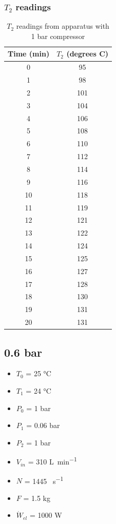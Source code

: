 \documentclass[class=article, crop=false, 12pt,a4paper]{standalone}
\numberwithin{equation}{section}
\begin{document}
\subsubsection{\(T_2\) readings} 
\begin{table}
  \centering
    \begin{tabular}{|c|c|}
      \hline
      Time (\si{\minute}) & \(T_2\) (degrees C)\\
      \hline
      0 & 95\\
      1 & 98\\
      2 & 101\\
      3 & 104\\
      4 & 106\\
      5 & 108\\
      6 & 110\\
      7 & 112\\
      8 & 114\\
      9 & 116\\
      10 & 118\\
      11 & 119\\
      12 & 121\\
      13 & 122\\
      14 & 124\\
      15 & 125\\
      16 & 127\\
      17 & 128\\
      18 & 130\\
      19 & 131\\
      20 & 131\\
      \hline
    \end{tabular}
  \caption{\(T_2\) readings from apparatus with 1 bar compressor}
  \label{table:1}
\end{table}
\subsection{0.6 bar}
\begin{multicols}{2}
  \begin{itemize}[noitemsep]
    \item \(T_0\) = 25 \si{\celsius}
    \item \(T_1\) = 24 \si{\celsius}
    \item \(P_0\) = 1 \si{\bar}
    \item \(P_1\) = 0.06 \si{\bar}
    \item \(P_2\) = 1 \si{\bar}
    \item \(V_{in}\) = 310 \si{\liter\per\minute}
    \item \(N\) = 1445 \si{\rev\per\second}
    \item \(F\) = 1.5 \si{\kilogram}
    \item \(\dot{W}_{el}\) = 1000 \si{\watt}
  \end{itemize}
\end{multicols}
\end{document}
